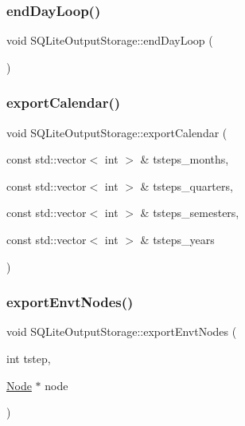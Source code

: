 \mbox{\label{class_s_q_lite_output_storage_ab78ec887182f12c0819ee48375071c64}} 
\subsubsection{\texorpdfstring{endDayLoop()}{endDayLoop()}}
{\footnotesize\ttfamily void S\+Q\+Lite\+Output\+Storage\+::end\+Day\+Loop (\begin{DoxyParamCaption}{ }\end{DoxyParamCaption})}

\mbox{\label{class_s_q_lite_output_storage_a4393d923aa9f3a01c3d259c8a30eee88}} 
\subsubsection{\texorpdfstring{exportCalendar()}{exportCalendar()}}
{\footnotesize\ttfamily void S\+Q\+Lite\+Output\+Storage\+::export\+Calendar (\begin{DoxyParamCaption}\item[{const std\+::vector$<$ int $>$ \&}]{tsteps\+\_\+months,  }\item[{const std\+::vector$<$ int $>$ \&}]{tsteps\+\_\+quarters,  }\item[{const std\+::vector$<$ int $>$ \&}]{tsteps\+\_\+semesters,  }\item[{const std\+::vector$<$ int $>$ \&}]{tsteps\+\_\+years }\end{DoxyParamCaption})}

\mbox{\label{class_s_q_lite_output_storage_ae344ba008d0b7d73c62a4bb57f643ec0}} 
\subsubsection{\texorpdfstring{exportEnvtNodes()}{exportEnvtNodes()}}
{\footnotesize\ttfamily void S\+Q\+Lite\+Output\+Storage\+::export\+Envt\+Nodes (\begin{DoxyParamCaption}\item[{int}]{tstep,  }\item[{\mbox{\hyperlink{class_node}{Node}} $\ast$}]{node }\end{DoxyParamCaption})}

